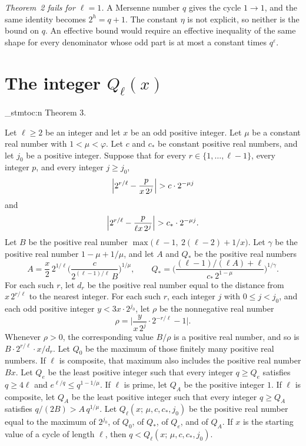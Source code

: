 \documentclass[11pt]{article}
\newenvironment{named}[1]{%
  \par\addvspace{\medskipamount}%
  \pagebreak[3]%
  \noindent{\bfseries #1}\space\ignorespaces
  \stmtoc{#1}%
}{\par\addvspace{\medskipamount}}
\newcommand{\stmtoc}[1]{ \qn_stmtoc:n {#1} }
\newcounter{stmtref}
\newcommand{\markstmt}[2]{%
  \setcounter{stmtref}{#1}%
  \addtocounter{stmtref}{-1}%
  \refstepcounter{stmtref}%
  \label{#2}%
}
\begin{document}
\emph{Theorem~2 fails for $\ell = 1$.}
A Mersenne number $q$ gives the cycle $1 \to 1$, and the same identity becomes $2^h = q + 1$.
The constant $\eta$ is not explicit, so neither is the bound on $q$.
An effective bound would require an effective inequality of the same shape for every denominator whose odd part is at most a constant times $q^\varepsilon$.

\section{The integer $Q_\ell(x)$}
\label{sec:ql}

\begin{named}{Theorem 3.}
\markstmt{3}{thm:bound}
Let $\ell \ge 2$ be an integer and let $x$ be an odd positive integer.
Let $\mu$ be a constant real number with $1 < \mu < \varphi$.
Let $c$ and $c_*$ be constant positive real numbers, and let $j_0$ be a positive integer.
Suppose that for every $r \in \{1, \ldots, \ell-1\}$, every integer $p$, and every integer $j \ge j_0$,
\[
\Bigl| 2^{r/\ell} - \frac{p}{x\, 2^{j}} \Bigr| > c \cdot 2^{-\mu j}
\]
and
\[
\Bigl| 2^{r/\ell} - \frac{p}{\ell x\, 2^{j}} \Bigr| > c_* \cdot 2^{-\mu j}.
\]
Let $B$ be the positive real number $\max\bigl(\ell-1,\ 2(\ell-2) + 1/x\bigr)$.
Let $\gamma$ be the positive real number $1 - \mu + 1/\mu$, and let $A$ and $Q_*$ be the positive real numbers
\[
A = \frac{x}{2}\, 2^{1/\ell}
\Biggl( \frac{c}{2^{(\ell-1)/\ell}\, B} \Biggr)^{1/\mu},
\qquad
Q_* = \Biggl( \frac{(\ell-1)/(\ell A) + \ell}{c_*\, 2^{1-\mu}} \Biggr)^{1/\gamma}.
\]
For each such $r$, let $d_r$ be the positive real number equal to the distance from $x\, 2^{r/\ell}$ to the nearest integer.
For each such $r$, each integer $j$ with $0 \le j < j_0$, and each odd positive integer $y < 3x \cdot 2^{j_0}$, let $\rho$ be the nonnegative real number
\[
\rho = \Biggl| \frac{y}{x\, 2^{j}} \cdot 2^{-r/\ell} - 1 \Biggr|.
\]
Whenever $\rho > 0$, the corresponding value $B/\rho$ is a positive real number, and so is $B \cdot 2^{r/\ell} \cdot x / d_r$.
Let $Q_0$ be the maximum of those finitely many positive real numbers.
If $\ell$ is composite, that maximum also includes the positive real number $Bx$.
Let $Q_e$ be the least positive integer such that every integer $q \ge Q_e$ satisfies $q \ge 4\ell$ and $e^{\ell/q} \le q^{1-1/\mu}$.
If $\ell$ is prime, let $Q_A$ be the positive integer $1$.
If $\ell$ is composite, let $Q_A$ be the least positive integer such that every integer $q \ge Q_A$ satisfies $q/(2B) > A\, q^{1/\mu}$.
Let $Q_\ell(x;\, \mu, c, c_*, j_0)$ be the positive real number equal to the maximum of $2^{j_0}$, of $Q_0$, of $Q_*$, of $Q_e$, and of $Q_A$.
If $x$ is the starting value of a cycle of length $\ell$, then $q < Q_\ell(x;\, \mu, c, c_*, j_0)$.
\end{named}
\end{document}
